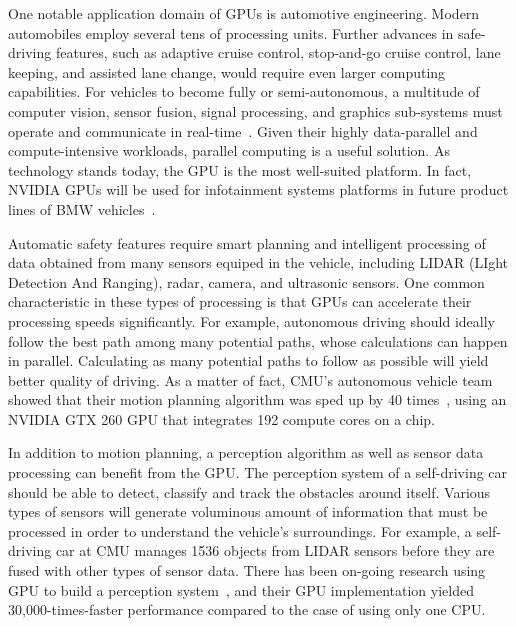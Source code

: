 \documentclass[times, 10pt, twocolumn]{article}
\begin{document}
One notable application domain of GPUs is automotive engineering.
Modern automobiles employ several tens of processing units.
Further advances in safe-driving features, such as adaptive
cruise control, stop-and-go cruise control, lane keeping, and assisted
lane change, would require even larger computing capabilities.
For vehicles to become fully or semi-autonomous, 
a multitude of computer vision,
sensor fusion, signal processing, and graphics sub-systems must operate and
communicate in real-time~\cite{Kelly12, Markoff10, Urmson08}.
Given their highly data-parallel and compute-intensive workloads, 
parallel computing is a useful solution.
As technology stands today, the GPU is the most well-suited platform.
In fact, NVIDIA GPUs will be used for infotainment systems platforms in
future product lines of BMW vehicles~\cite{NVIDIA_BMW}.

Automatic safety features require smart planning and intelligent
processing of data obtained from many sensors equiped in the vehicle,
including LIDAR (LIght Detection And Ranging), radar, camera, and
ultrasonic sensors. 
One common characteristic in these types of processing is that GPUs can
accelerate their processing speeds significantly.
For example, autonomous driving should ideally follow the best path among
many potential paths, whose calculations can happen in parallel.
Calculating as many potential paths to follow as possible
will yield better quality of driving.
As a matter of fact, CMU's autonomous vehicle team showed that their
motion planning algorithm was sped up by 40 times~\cite{McNaughton11},
using an NVIDIA GTX 260 GPU that integrates 192 compute cores on a
chip.

In addition to motion planning, a perception algorithm as well as 
sensor data processing can benefit from the GPU.
The perception system of a self-driving car should
be able to detect, classify and track the obstacles around
itself. Various types of sensors will generate voluminous amount of
information that must be processed in order to understand the vehicle's surroundings. 
For example, a self-driving car at CMU manages 1536 objects from LIDAR
sensors before they are fused with other types of sensor data. There has
been on-going research using GPU to build a perception
system~\cite{Ferreira11}, and their GPU implementation yielded
30,000-times-faster performance compared to the case of using only one CPU. 
\end{document}

